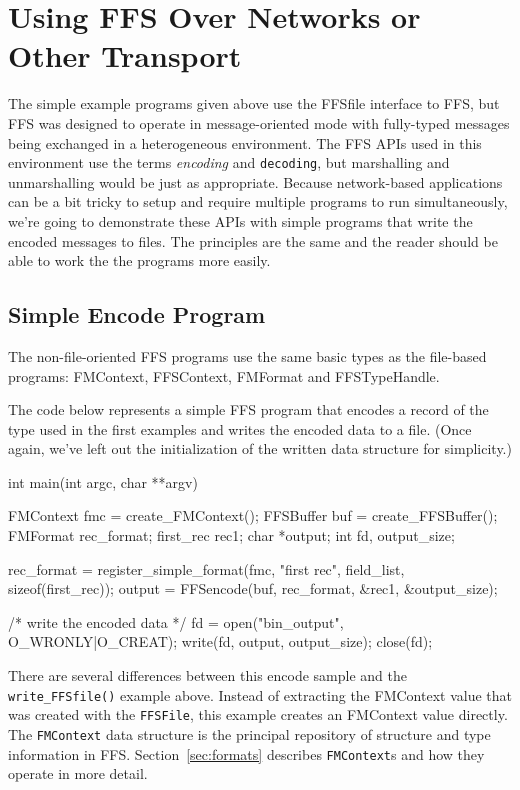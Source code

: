 \section{Using FFS Over Networks or Other Transport}

The simple example programs given above use the FFSfile interface to FFS,
but FFS was designed to operate in message-oriented mode with fully-typed
messages being exchanged in a heterogeneous environment.  The FFS APIs used
in this environment use the terms {\em encoding} and {\tt decoding}, but
marshalling and unmarshalling would be just as appropriate.  Because
network-based applications can be a bit tricky to setup and require multiple
programs to run simultaneously, we're going to demonstrate these APIs with
simple programs that write the encoded messages to files.  The principles
are the same and the reader should be able to work the the programs more
easily.

\subsection{Simple Encode Program}

The non-file-oriented FFS programs use the same basic types as the
file-based programs: FMContext, FFSContext, FMFormat and FFSTypeHandle.

The code below represents a simple FFS program that encodes a record of the
type used in the first examples and writes the encoded data to a file.  
(Once again, we've left out the initialization of the written data structure
for simplicity.)
\begin{Code}
int main(int argc, char **argv)
{
    FMContext fmc = create_FMContext();
    FFSBuffer buf = create_FFSBuffer();
    FMFormat rec_format;
    first_rec rec1;
    char *output;
    int fd, output_size;

    rec_format = register_simple_format(fmc, "first rec", field_list, sizeof(first_rec));
    output = FFSencode(buf, rec_format, &rec1, &output_size);

    /* write the encoded data */
    fd = open("bin_output", O_WRONLY|O_CREAT);
    write(fd, output, output_size);
    close(fd);
}
\end{Code}
There are several differences between this encode sample and the
{\tt write\_FFSfile()} example above.  Instead of extracting the FMContext value
that was created with the {\tt FFSFile}, this example creates an FMContext value
directly.  The {\tt FMContext} data structure is the principal repository of
structure and type information in FFS.  Section~\ref{sec:formats} describes
{\tt FMContext}s and how they operate in more detail.

